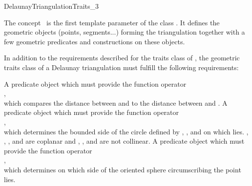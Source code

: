 

\begin{ccRefConcept}{DelaunayTriangulationTraits_3}

\ccDefinition
The concept \ccRefName\ is the first template parameter of the class
. It defines the geometric objects (points,
segments...) forming the triangulation together with a few geometric
predicates and constructions on these objects.

\ccRefines {}

In addition to the requirements described for the traits class of
, the geometric traits class of a
Delaunay triangulation must fulfill the following requirements:

\ccTypes
{}

\ccGlue
{}
\ccGlue
{}
\ccGlue
{}


{A predicate object which must provide the function operator\\
,\\
which compares the distance between  and  to the distance
between  and .}
\ccGlue
{}
{A predicate object which must provide the function operator\\
,\\
which determines the bounded side of the circle defined
by , , and  on which  lies.
\ccPrecond {}, , , and  are coplanar and
, , and  are not collinear.}
\ccGlue
{}
{A predicate object which must provide the function operator\\
,\\
which determines on which side of the oriented sphere circumscribing 
 the point  lies.}


\end{ccRefConcept}
